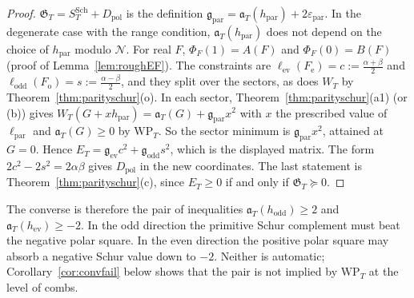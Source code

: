 \documentclass[11pt]{amsart}
\theoremstyle{definition}
\theoremstyle{remark}
\begin{document}
\begin{proof}
$\mathfrak G_T=S^{\mathrm{Sch}}_T+D_{\mathrm{pol}}$ is the definition $\mathfrak g_{\mathrm{par}}=\mathfrak a_T(h_{\mathrm{par}})+2\varepsilon_{\mathrm{par}}$. In the
degenerate case with the range condition, $\mathfrak a_T(h_{\mathrm{par}})$ does not depend on the choice of $h_{\mathrm{par}}$
modulo $\mathcal N$. For real $F$, $\Phi_F(1)=A(F)$ and $\Phi_F(0)=B(F)$ (proof of Lemma~\ref{lem:roughEF}). The
constraints are $\ell_{\mathrm{ev}}(F_{\mathrm e})=c:=\frac{\alpha+\beta}2$ and $\ell_{\mathrm{odd}}(F_{\mathrm o})=s:=\frac{\alpha-\beta}2$,
and they split over the sectors, as does $W_T$ by Theorem~\ref{thm:parityschur}(o). In each sector,
Theorem~\ref{thm:parityschur}(a1) (or (b)) gives $W_T(G+xh_{\mathrm{par}})=\mathfrak a_T(G)+\mathfrak g_{\mathrm{par}}x^2$ with $x$ the
prescribed value of $\ell_{\mathrm{par}}$ and $\mathfrak a_T(G)\ge0$ by $\mathrm{WP}_T$. So the sector minimum is
$\mathfrak g_{\mathrm{par}}x^2$, attained at $G=0$. Hence $E_T=\mathfrak g_{\mathrm{ev}}c^2+\mathfrak g_{\mathrm{odd}}s^2$, which is the displayed
matrix. The form $2c^2-2s^2=2\alpha\beta$ gives $D_{\mathrm{pol}}$ in the new coordinates. The last statement is
Theorem~\ref{thm:parityschur}(c), since $E_T\ge0$ if and only if $\mathfrak G_T\succeq0$.
\end{proof}

The converse is therefore the pair of inequalities $\mathfrak a_T(h_{\mathrm{odd}})\ge2$ and
$\mathfrak a_T(h_{\mathrm{ev}})\ge-2$. In the odd direction the primitive Schur complement must beat the negative
polar square. In the even direction the positive polar square may absorb a negative Schur value down
to $-2$. Neither is automatic; Corollary~\ref{cor:convfail} below shows that the pair is not implied by
$\mathrm{WP}_T$ at the level of combs.
\end{document}
